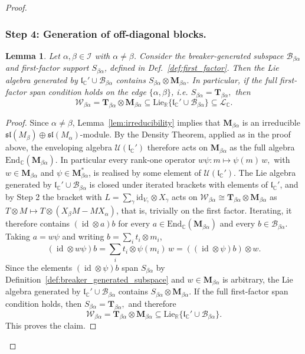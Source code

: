 \documentclass[10pt,twocolumn,superscriptaddress,aps,amsmath,amssymb,citeautoscript,floatfix,prx]{revtex4-2}
\newcounter{alg}
\theoremstyle{plain}
\theoremstyle{plain}
\theoremstyle{plain}
\theoremstyle{plain}
\theoremstyle{plain}
\theoremstyle{plain}
\newcommand{\C}{\mathbb{C}}
\newcommand{\R}{\mathbb{R}}
\newcommand{\End}{\mathrm{End}}
\newcommand{\Lie}{\mathrm{Lie}}
\newcommand{\id}{\mathrm{id}}
\theoremstyle{plain}
\newtheorem{smlemma}[smtheorem]{Lemma}
\theoremstyle{definition}
\theoremstyle{plain}
\begin{document}
\begin{appendix}
\begin{proof}
\subsubsection*{Step 4: Generation of off-diagonal blocks.}

\begin{smlemma}\label{prop:block_generation}
Let $\alpha,\beta\in\mathcal I$ with $\alpha\neq\beta$. Consider the
breaker-generated subspace $\mathcal B_{\beta\alpha}$ and first-factor support $S_{\beta\alpha}$, defined in Def.~\ref{def:first_factor}. Then the Lie algebra generated by
$
\mathfrak l_\C' \cup \mathcal B_{\beta\alpha}
$
contains
$
S_{\beta\alpha}\otimes \mathbf M_{\beta\alpha}.
$
In particular, if the full first-factor span condition holds on the edge $\{\alpha,\beta\}$, i.e.
$
S_{\beta\alpha}=\mathbf T_{\beta\alpha},
$
then
\[
\mathcal W_{\beta\alpha}
=
\mathbf T_{\beta\alpha}\otimes \mathbf M_{\beta\alpha}
\subseteq
\Lie_{\R}\{\mathfrak l_\C' \cup \mathcal B_{\beta\alpha}\}
\subseteq \mathcal L_\C.
\]
\end{smlemma}

\begin{proof}
Since $\alpha\neq\beta$, Lemma~\ref{lem:irreducibility} implies that $\mathbf M_{\beta\alpha}$ is an irreducible
$\mathfrak{sl}(M_\beta)\oplus \mathfrak{sl}(M_\alpha)$-module.
By the Density Theorem, applied as in the proof above, the enveloping algebra $\mathcal U(\mathfrak l_\C')$ therefore acts on $\mathbf M_{\beta\alpha}$ 
as the full algebra $\End_\C(\mathbf M_{\beta\alpha})$. In particular every rank-one operator
$
w\psi:m\mapsto\psi(m)\,w,
$
with $w\in\mathbf M_{\beta\alpha}$ and $\psi\in\mathbf M_{\beta\alpha}^*$, is realised by some element of $\mathcal U(\mathfrak l_\C')$.
The Lie algebra generated by $\mathfrak l_\C'\cup\mathcal B_{\beta\alpha}$ is closed under iterated brackets with elements of $\mathfrak l_\C'$, 
and by Step 2 the bracket with $L=\sum_\gamma\id_{V_\gamma}\otimes X_\gamma$ acts on $\mathcal W_{\beta\alpha}\cong\mathbf T_{\beta\alpha}\otimes\mathbf M_{\beta\alpha}$ as $T\otimes M\mapsto T\otimes(X_\beta M-MX_\alpha)$, 
that is, trivially on the first factor. Iterating, it therefore contains $(\operatorname{id}\otimes a)b$ for every $a\in\End_\C(\mathbf M_{\beta\alpha})$ 
and every $b\in\mathcal B_{\beta\alpha}$. Taking $a=w\psi$ and writing $b=\sum_i t_i\otimes m_i$,
\[
\left(\operatorname{id}\otimes w\psi\right)b
=\sum_i t_i\otimes\psi(m_i)\,w
=\left(\left(\operatorname{id}\otimes\psi\right)b\right)\otimes w .
\]
Since the elements $(\operatorname{id}\otimes\psi)b$ span $S_{\beta\alpha}$ by Definition~\ref{def:breaker_generated_subspace} and $w\in\mathbf M_{\beta\alpha}$ is arbitrary, the Lie algebra generated by
$
\mathfrak l_\C' \cup \mathcal B_{\beta\alpha}
$
contains
$
S_{\beta\alpha}\otimes \mathbf M_{\beta\alpha}.
$
If the full first-factor span condition holds, then
$
S_{\beta\alpha}=\mathbf T_{\beta\alpha},
$
and therefore
\[
\mathcal W_{\beta\alpha}
=
\mathbf T_{\beta\alpha}\otimes \mathbf M_{\beta\alpha}
\subseteq
\Lie_{\R}\{\mathfrak l_\C' \cup \mathcal B_{\beta\alpha}\}.
\]
This proves the claim.
\end{proof}


\end{proof}
\end{appendix}
\end{document}
